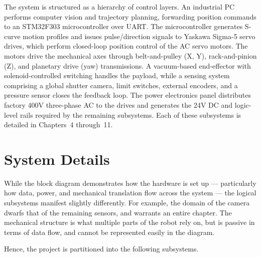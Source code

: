 The system is structured as a hierarchy of control layers. An industrial PC performs computer vision and trajectory planning, forwarding position commands to an STM32F303 microcontroller over UART. The microcontroller generates S-curve motion profiles and issues pulse/direction signals to Yaskawa Sigma-5 servo drives, which perform closed-loop position control of the AC servo motors. The motors drive the mechanical axes through belt-and-pulley (X, Y), rack-and-pinion (Z), and planetary drive (yaw) transmissions. A vacuum-based end-effector with solenoid-controlled switching handles the payload, while a sensing system comprising a global shutter camera, limit switches, external encoders, and a pressure sensor closes the feedback loop. The power electronics panel distributes factory 400V three-phase AC to the drives and generates the 24V DC and logic-level rails required by the remaining subsystems. Each of these subsystems is detailed in Chapters~4 through~11.


\section{System Details}

While the block diagram demonstrates how the hardware is set up --- particularly how data, power, and mechanical translation flow across the system --- the logical subsystems manifest slightly differently. For example, the domain of the camera dwarfs that of the remaining sensors, and warrants an entire chapter. The mechanical structure is what multiple parts of the robot rely on, but is passive in terms of data flow, and cannot be represented easily in the diagram.

Hence, the project is partitioned into the following subsystems.

